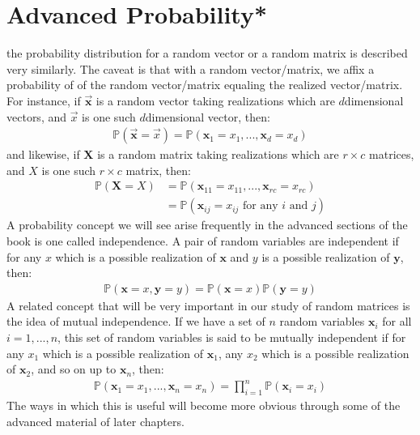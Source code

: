 \documentclass[letterpaper,10pt,english]{jupyterBook}
\begin{document}
\section{Advanced Probability*}
\label{\detokenize{introduction/terminology:advanced-probability}}
\sphinxAtStartPar
the probability distribution for a random vector or a random matrix is described very similarly. The caveat is that with a random vector/matrix, we affix a probability of  of the random vector/matrix equaling the realized vector/matrix. For instance, if \(\vec{\mathbf x}\) is a random vector taking realizations which are \(d\)\sphinxhyphen{}dimensional vectors, and \(\vec x\) is one such \(d\)\sphinxhyphen{}dimensional vector, then:
\begin{align*}
    \mathbb P(\vec{\mathbf x} = \vec x) = \mathbb P(\mathbf x_1 = x_1, ..., \mathbf x_d = x_d)
\end{align*}
\sphinxAtStartPar
and likewise, if \(\mathbf X\) is a random matrix taking realizations which are \(r \times c\) matrices, and \(X\) is one such \(r \times c\) matrix, then:
\begin{align*}
    \mathbb P(\mathbf X = X) &= \mathbb P(\mathbf x_{11} = x_{11}, ..., \mathbf x_{rc} = x_{rc}) \\
    &= \mathbb P(\mathbf x_{ij} = x_{ij} \text{ for any }i\text{ and }j)
\end{align*}
\sphinxAtStartPar
A probability concept we will see arise frequently in the advanced sections of the book is one called independence. A pair of random variables are independent if for any \(x\) which is a possible realization of \(\mathbf x\) and \(y\) is a possible realization of \(\mathbf y\), then:
\begin{align*}
    \mathbb P(\mathbf x = x, \mathbf y = y) = \mathbb P(\mathbf x = x) \mathbb P(\mathbf y = y)
\end{align*}
\sphinxAtStartPar
A related concept that will be very important in our study of random matrices is the idea of mutual independence. If we have a set of \(n\) random variables \(\mathbf x_i\) for all \(i = 1,..., n\), this set of random variables is said to be mutually independent if for any \(x_1\) which is a possible realization of \(\mathbf x_1\), any \(x_2\) which is a possible realization of \(\mathbf x_2\), and so on up to \(\mathbf x_n\), then:
\begin{align*}
    \mathbb P(\mathbf x_1 = x_1, ..., \mathbf x_n = x_n) = \prod_{i = 1}^n \mathbb P(\mathbf x_i = x_i)
\end{align*}
\sphinxAtStartPar
The ways in which this is useful will become more obvious through some of the advanced material of later chapters.
\end{document}
